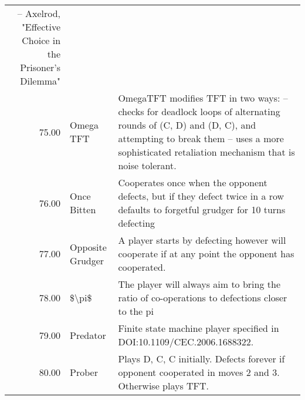 \begin{tabular}{rll}
	-- Axelrod, "Effective Choice in the Prisoner's Dilemma" \\
	75.00  & Omega TFT                   & OmegaTFT modifies TFT in two ways:
	-- checks for deadlock loops of alternating rounds of (C, D) and (D, C),
	and attempting to break them
	-- uses a more sophisticated retaliation mechanism that is noise tolerant.                                                                                                                                                                                                                                                                                                                                                                                                                                                                                                                                                                                                                                                                                                                                                                                 \\
	76.00  & Once Bitten                 & Cooperates once when the opponent defects, but if they defect twice in a row defaults to forgetful grudger for 10 turns defecting \\
	77.00  & Opposite Grudger            & A player starts by defecting however will cooperate if at any point the opponent has cooperated.                                  \\
	78.00  & \$\textbackslash{}pi\$      & The player will always aim to bring the ratio of co-operations to defections closer to the pi                                     \\
	79.00  & Predator                    & Finite state machine player specified in DOI:10.1109/CEC.2006.1688322.                                                            \\
	80.00  & Prober                      & Plays D, C, C initially. Defects forever if opponent cooperated in moves 2
	and 3. Otherwise plays TFT.                                                                                                                                                                                                                                                                                                                                                                                                                                                                                                                                                                                                                                                                                                                                                                                                                                                                                                               \\

\end{tabular}
